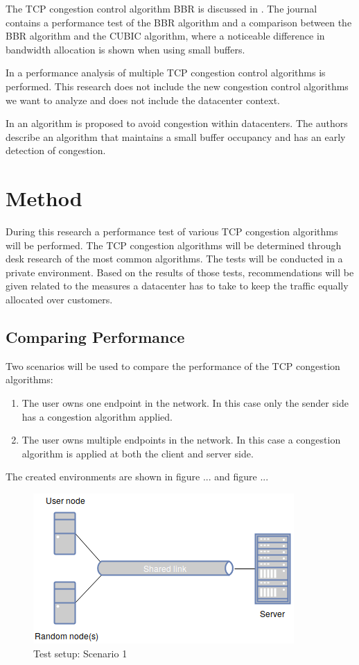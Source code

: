\documentclass{article}
\begin{document}

The TCP congestion control algorithm BBR is discussed in \cite{bbr-congestion}.
The journal contains a performance test of the BBR algorithm and a comparison
between the BBR algorithm and the CUBIC algorithm, where a noticeable
difference in bandwidth allocation is shown when using small buffers.

In \cite{multiple-congestion} a performance analysis of multiple TCP congestion
control algorithms is performed. This research does not include the new
congestion control algorithms we want to analyze and does not include the
datacenter context.

In \cite{dctcp-congestion-original} an algorithm is proposed to avoid
congestion within datacenters. The authors describe an algorithm that maintains
a small buffer occupancy and has an early detection of congestion.


\section{Method}
During this research a performance test of various TCP congestion algorithms will be performed. The TCP congestion algorithms will be determined through desk research of the most common algorithms. The tests will be conducted in a private environment. Based on the results of those tests, recommendations will be given related to the measures a datacenter has to take to keep the traffic equally allocated over customers. 
	
	\subsection{Comparing Performance}
	Two scenarios will be used to compare the performance of the TCP 				congestion algorithms:
	\begin{enumerate}
		\item The user owns one endpoint in the network. In this case only 				the sender side has a congestion algorithm applied.
		\item The user owns multiple endpoints in the network. In this case a			congestion algorithm is applied at both the client and server side.
	\end{enumerate}
	
	The created environments are shown in figure ... and figure ...
	\begin{figure}[H] 
		\label{fig:setup1}
		\caption{Test setup: Scenario 1}
		\begin{center}
  			\includegraphics[scale=0.5]{figs/setup1.png}
  		\end{center}
	\end{figure}
	
\end{document}
